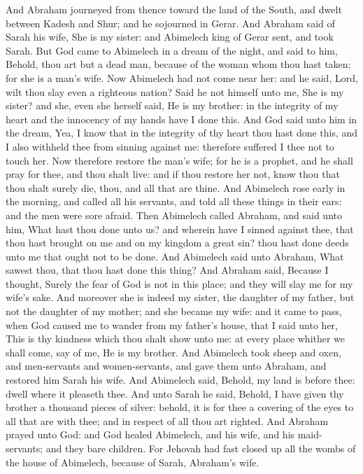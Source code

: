 And Abraham journeyed from thence toward the land of the South, and dwelt between Kadesh and Shur; and he sojourned in Gerar. And Abraham said of Sarah his wife, She is my sister: and Abimelech king of Gerar sent, and took Sarah. But God came to Abimelech in a dream of the night, and said to him, Behold, thou art but a dead man, because of the woman whom thou hast taken; for she is a man’s wife. Now Abimelech had not come near her: and he said, Lord, wilt thou slay even a righteous nation? Said he not himself unto me, She is my sister? and she, even she herself said, He is my brother: in the integrity of my heart and the innocency of my hands have I done this. And God said unto him in the dream, Yea, I know that in the integrity of thy heart thou hast done this, and I also withheld thee from sinning against me: therefore suffered I thee not to touch her. Now therefore restore the man’s wife; for he is a prophet, and he shall pray for thee, and thou shalt live: and if thou restore her not, know thou that thou shalt surely die, thou, and all that are thine.  And Abimelech rose early in the morning, and called all his servants, and told all these things in their ears: and the men were sore afraid. Then Abimelech called Abraham, and said unto him, What hast thou done unto us? and wherein have I sinned against thee, that thou hast brought on me and on my kingdom a great sin? thou hast done deeds unto me that ought not to be done. And Abimelech said unto Abraham, What sawest thou, that thou hast done this thing? And Abraham said, Because I thought, Surely the fear of God is not in this place; and they will slay me for my wife’s sake. And moreover she is indeed my sister, the daughter of my father, but not the daughter of my mother; and she became my wife: and it came to pass, when God caused me to wander from my father’s house, that I said unto her, This is thy kindness which thou shalt show unto me: at every place whither we shall come, say of me, He is my brother. And Abimelech took sheep and oxen, and men-servants and women-servants, and gave them unto Abraham, and restored him Sarah his wife. And Abimelech said, Behold, my land is before thee: dwell where it pleaseth thee. And unto Sarah he said, Behold, I have given thy brother a thousand pieces of silver: behold, it is for thee a covering of the eyes to all that are with thee; and in respect of all thou art righted. And Abraham prayed unto God: and God healed Abimelech, and his wife, and his maid-servants; and they bare children. For Jehovah had fast closed up all the wombs of the house of Abimelech, because of Sarah, Abraham’s wife. 

